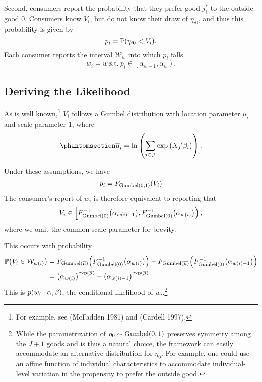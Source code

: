 \documentclass[
]{article}
\begin{document}
Second, consumers report the probability that they prefer good \(j^*_i\)
to the outside good 0. Consumers know \(V_i\), but do not know their
draw of \(\eta_{i0}\), and thus this probability is given by \[
    p_i = \mathbb{P}\mleft(\eta_{i0} < V_i \mright).
\] Each consumer reports the interval \(\mathcal{W}_w\) into which
\(p_i\) falls \[
    w_i = w\ \text{s.t.}\ p_i \in \left[\alpha_{w-1},\alpha_w\right).
\]

\subsection{Deriving the Likelihood}\label{deriving-the-likelihood}

As is well known,\footnote{For example, see (McFadden 1981) and (Cardell
  1997).} \(V_i\) follows a Gumbel distribution with location parameter
\(\overline{\mu}_i\) and scale parameter 1, where
\begin{equation}\phantomsection\label{eq-max-mu}{
    \overline{\mu}_i = \ln\left( \sum_{j\in\mathcal{J}} \exp\left({X_j}'\beta_i\right)\right).
}\end{equation}

Under these assumptions, we have \[
    p_i = F_{\text{Gumbel}\mleft(0,1\mright)}\mleft(V_i\mright)
\] The consumer's report of \(w_i\) is therefore equivalent to reporting
that \[
    V_i \in \left[
        F^{-1}_{\text{Gumbel}\mleft(0\mright)}\mleft(\alpha_{w\mleft(i\mright)-1}\mright),
        F^{-1}_{\text{Gumbel}\mleft(0\mright)}\mleft(\alpha_{w\mleft(i\mright)}\mright)
    \right),
\] where we omit the common scale parameter for brevity.

This occurs with probability \begin{align}
    \mathbb{P}\mleft(V_i \in \mathcal{W}_{w\mleft(i\mright)}\mright) &= F_{\text{Gumbel}\mleft(\overline{\mu}\mright)}\mleft(F^{-1}_{\text{Gumbel}\mleft(0\mright)}\mleft(\alpha_{w\mleft(i\mright)}\mright)\mright) - F_{\text{Gumbel}\mleft(\overline{\mu}\mright)}\mleft(F^{-1}_{\text{Gumbel}\mleft(0\mright)}\mleft(\alpha_{w\mleft(i\mright)-1}\mright)\mright) \\
    &= \left({\alpha_{w\mleft(i\mright)}}\right)^{\exp\left(\overline{\mu}\right)} - \left({\alpha_{w\mleft(i\mright)-1}}\right)^{\exp\left(\overline{\mu}\right)}.
\end{align} This is \(p\mleft(w_i\mid \alpha, \beta\mright)\), the
conditional likelihood of \(w_i\).\footnote{While the parametrization of
  \(\eta_0 \sim \text{Gumbel}\mleft(0,1\mright)\) preserves symmetry
  among the \(J+1\) goods and is thus a natural choice, the framework
  can easily accommodate an alternative distribution for \(\eta_0\). For
  example, one could use an affine function of individual
  characteristics to accommodate individual-level variation in the
  propensity to prefer the outside good.}
\end{document}
